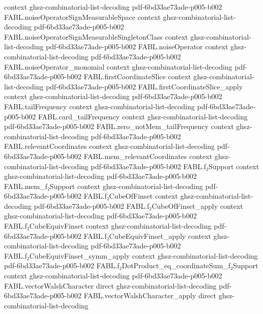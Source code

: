 \begin{theorem}
  {context}
  {ghsz-combinatorial-list-decoding}
  {pdf-6bd33ae73ade-p005-b002}
\proofstep
  {FABL.noiseOperatorSignMeasurableSpace}
  {context}
  {ghsz-combinatorial-list-decoding}
  {pdf-6bd33ae73ade-p005-b002}
\proofstep
  {FABL.noiseOperatorSignMeasurableSingletonClass}
  {context}
  {ghsz-combinatorial-list-decoding}
  {pdf-6bd33ae73ade-p005-b002}
\proofstep
  {FABL.noiseOperator}
  {context}
  {ghsz-combinatorial-list-decoding}
  {pdf-6bd33ae73ade-p005-b002}
\proofstep
  {FABL.noiseOperator_monomial}
  {context}
  {ghsz-combinatorial-list-decoding}
  {pdf-6bd33ae73ade-p005-b002}
\proofstep
  {FABL.firstCoordinateSlice}
  {context}
  {ghsz-combinatorial-list-decoding}
  {pdf-6bd33ae73ade-p005-b002}
\proofstep
  {FABL.firstCoordinateSlice_apply}
  {context}
  {ghsz-combinatorial-list-decoding}
  {pdf-6bd33ae73ade-p005-b002}
\proofstep
  {FABL.tailFrequency}
  {context}
  {ghsz-combinatorial-list-decoding}
  {pdf-6bd33ae73ade-p005-b002}
\proofstep
  {FABL.card_tailFrequency}
  {context}
  {ghsz-combinatorial-list-decoding}
  {pdf-6bd33ae73ade-p005-b002}
\proofstep
  {FABL.zero_notMem_tailFrequency}
  {context}
  {ghsz-combinatorial-list-decoding}
  {pdf-6bd33ae73ade-p005-b002}
\proofstep
  {FABL.relevantCoordinates}
  {context}
  {ghsz-combinatorial-list-decoding}
  {pdf-6bd33ae73ade-p005-b002}
\proofstep
  {FABL.mem_relevantCoordinates}
  {context}
  {ghsz-combinatorial-list-decoding}
  {pdf-6bd33ae73ade-p005-b002}
\proofstep
  {FABL.f₂Support}
  {context}
  {ghsz-combinatorial-list-decoding}
  {pdf-6bd33ae73ade-p005-b002}
\proofstep
  {FABL.mem_f₂Support}
  {context}
  {ghsz-combinatorial-list-decoding}
  {pdf-6bd33ae73ade-p005-b002}
\proofstep
  {FABL.f₂CubeOfFinset}
  {context}
  {ghsz-combinatorial-list-decoding}
  {pdf-6bd33ae73ade-p005-b002}
\proofstep
  {FABL.f₂CubeOfFinset_apply}
  {context}
  {ghsz-combinatorial-list-decoding}
  {pdf-6bd33ae73ade-p005-b002}
\proofstep
  {FABL.f₂CubeEquivFinset}
  {context}
  {ghsz-combinatorial-list-decoding}
  {pdf-6bd33ae73ade-p005-b002}
\proofstep
  {FABL.f₂CubeEquivFinset_apply}
  {context}
  {ghsz-combinatorial-list-decoding}
  {pdf-6bd33ae73ade-p005-b002}
\proofstep
  {FABL.f₂CubeEquivFinset_symm_apply}
  {context}
  {ghsz-combinatorial-list-decoding}
  {pdf-6bd33ae73ade-p005-b002}
\proofstep
  {FABL.f₂DotProduct_eq_coordinateSum_f₂Support}
  {context}
  {ghsz-combinatorial-list-decoding}
  {pdf-6bd33ae73ade-p005-b002}
\proofstep
  {FABL.vectorWalshCharacter}
  {direct}
  {ghsz-combinatorial-list-decoding}
  {pdf-6bd33ae73ade-p005-b002}
\proofstep
  {FABL.vectorWalshCharacter_apply}
  {direct}
  {ghsz-combinatorial-list-decoding}

\end{theorem}
